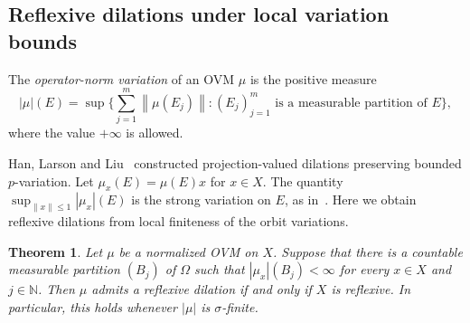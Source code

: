 \documentclass[11pt,leqno]{amsart}
\theoremstyle{compact}
\numberwithin{equation}{section}
\newtheorem{theorem}{Theorem}[section]
\theoremstyle{compactremark}
\theoremstyle{compact}
\newcommand{\1}{\mathbbm{1}}
\newcommand{\N}{\mathbb{N}}
\newcommand{\norm}[1]{\left\|#1\right\|}
\newcommand{\abs}[1]{\left|#1\right|}
\begin{document}
\subsection[Reflexive dilations under local variation bounds]{Reflexive dilations under local variation bounds}

The \emph{operator-norm variation} of an OVM $\mu$ is the positive measure
\[
\abs{\mu}(E)
=\sup\Big\{\sum_{j=1}^{m}\norm{\mu(E_j)}:
(E_j)_{j=1}^{m}\text{ is a measurable partition of }E\Big\},
\]
where the value $+\infty$ is allowed.

Han, Larson and Liu~\cite[Theorem~1.2]{HanLarsonLiu2018} constructed projection-valued dilations preserving bounded $p$-variation. Let $\mu_x(E)=\mu(E)x$ for $x\in X$. The quantity $\sup_{\norm{x}\leq1}\abs{\mu_x}(E)$ is the strong variation on $E$, as in~\cite[Section~2.6]{HanLarsonLiuLiu2014}. Here we obtain reflexive dilations from local finiteness of the orbit variations.

\begin{theorem}\label{thm:variation-reflexive-dilation}
Let $\mu$ be a normalized OVM on $X$. Suppose that there is a countable measurable partition $(B_j)$ of $\Omega$ such that $\abs{\mu_x}(B_j)<\infty$ for every $x\in X$ and $j\in\N$. Then $\mu$ admits a reflexive dilation if and only if $X$ is reflexive. In particular, this holds whenever $\abs{\mu}$ is $\sigma$-finite.
\end{theorem}
\end{document}
